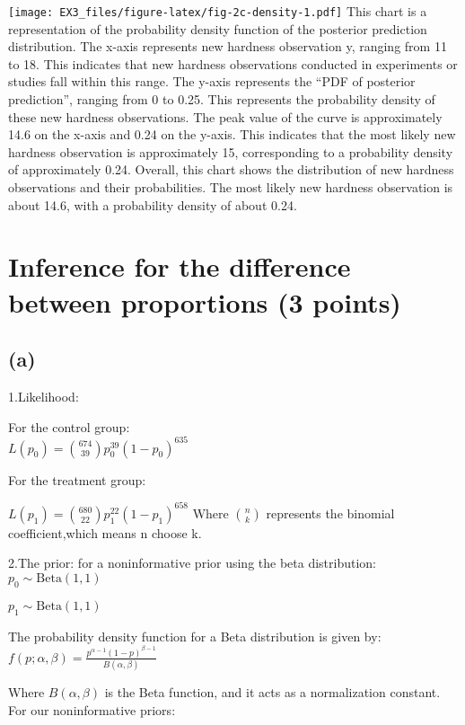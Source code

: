 \documentclass[
]{article}
\begin{document}
\texttt{[image: EX3\_files/figure-latex/fig-2c-density-1.pdf]} This chart
is a representation of the probability density function of the posterior
prediction distribution. The x-axis represents new hardness observation
y, ranging from 11 to 18. This indicates that new hardness observations
conducted in experiments or studies fall within this range. The y-axis
represents the ``PDF of posterior prediction'', ranging from 0 to 0.25.
This represents the probability density of these new hardness
observations. The peak value of the curve is approximately 14.6 on the
x-axis and 0.24 on the y-axis. This indicates that the most likely new
hardness observation is approximately 15, corresponding to a probability
density of approximately 0.24. Overall, this chart shows the
distribution of new hardness observations and their probabilities. The
most likely new hardness observation is about 14.6, with a probability
density of about 0.24.

\hypertarget{inference-for-the-difference-between-proportions-3-points}{%
\section{Inference for the difference between proportions (3
points)}\label{inference-for-the-difference-between-proportions-3-points}}

\hypertarget{a-1}{%
\subsection{(a)}\label{a-1}}

1.Likelihood:

For the control group:\\
\(L(p_0) = \binom{674}{39} p_0^{39} (1-p_0)^{635}\)

For the treatment group:

\(L(p_1) = \binom{680}{22} p_1^{22} (1-p_1)^{658}\) Where
\(\binom{n}{k}\) represents the binomial coefficient,which means n
choose k.

2.The prior: for a noninformative prior using the beta distribution:
\(p_0 \sim \text{Beta}(1,1)\)

\(p_1 \sim \text{Beta}(1,1)\)

The probability density function for a Beta distribution is given by:
\(f(p; \alpha, \beta) = \frac{p^{\alpha-1}(1-p)^{\beta-1}}{B(\alpha,\beta)}\)

Where \(B(\alpha,\beta)\) is the Beta function, and it acts as a
normalization constant. For our noninformative priors:
\end{document}
